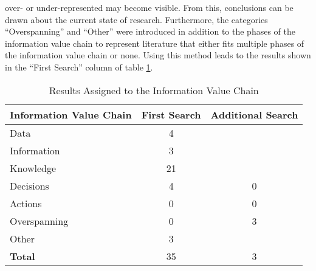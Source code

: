 over- or under-represented may become visible. From this, conclusions can be drawn about the current state of research. Furthermore, the categories \enquote{Overspanning} and \enquote{Other} were introduced in addition to the phases of the information value chain to represent literature that either fits multiple phases of the information value chain or none. Using this method leads to the results shown in the \enquote{First Search} column of table \ref{informationValueChainResults}.


\begin{table}[htbp]
    \centering
    \small
    \begin{tabular}{lcc}
    \hline
    \multicolumn{1}{c}{Information Value Chain}  & First Search & \multicolumn{1}{l}{Additional Search} \\ \hline
    Data                                         & 4            &                                       \\
    Information                                  & 3            &                                       \\
    Knowledge                                    & 21           &                                       \\
    Decisions                                    & 4            & 0                                      \\
    Actions                                      & 0            & 0                                      \\
    Overspanning                                 & 0            & 3                                     \\
    Other                                        & 3            &                                       \\ \hline
    \textbf{Total}                               & 35           & 3                                     \\ \hline
    \end{tabular}
    \caption{Results Assigned to the Information Value Chain}
    \label{informationValueChainResults}
    \end{table}

